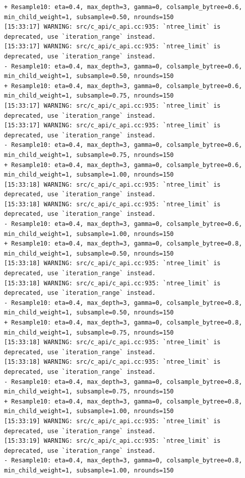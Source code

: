 \documentclass[
  letterpaper,
  DIV=11,
  numbers=noendperiod]{scrartcl}
\begin{document}
\begin{verbatim}
+ Resample10: eta=0.4, max_depth=3, gamma=0, colsample_bytree=0.6, min_child_weight=1, subsample=0.50, nrounds=150 
[15:33:17] WARNING: src/c_api/c_api.cc:935: `ntree_limit` is deprecated, use `iteration_range` instead.
[15:33:17] WARNING: src/c_api/c_api.cc:935: `ntree_limit` is deprecated, use `iteration_range` instead.
- Resample10: eta=0.4, max_depth=3, gamma=0, colsample_bytree=0.6, min_child_weight=1, subsample=0.50, nrounds=150 
+ Resample10: eta=0.4, max_depth=3, gamma=0, colsample_bytree=0.6, min_child_weight=1, subsample=0.75, nrounds=150 
[15:33:17] WARNING: src/c_api/c_api.cc:935: `ntree_limit` is deprecated, use `iteration_range` instead.
[15:33:17] WARNING: src/c_api/c_api.cc:935: `ntree_limit` is deprecated, use `iteration_range` instead.
- Resample10: eta=0.4, max_depth=3, gamma=0, colsample_bytree=0.6, min_child_weight=1, subsample=0.75, nrounds=150 
+ Resample10: eta=0.4, max_depth=3, gamma=0, colsample_bytree=0.6, min_child_weight=1, subsample=1.00, nrounds=150 
[15:33:18] WARNING: src/c_api/c_api.cc:935: `ntree_limit` is deprecated, use `iteration_range` instead.
[15:33:18] WARNING: src/c_api/c_api.cc:935: `ntree_limit` is deprecated, use `iteration_range` instead.
- Resample10: eta=0.4, max_depth=3, gamma=0, colsample_bytree=0.6, min_child_weight=1, subsample=1.00, nrounds=150 
+ Resample10: eta=0.4, max_depth=3, gamma=0, colsample_bytree=0.8, min_child_weight=1, subsample=0.50, nrounds=150 
[15:33:18] WARNING: src/c_api/c_api.cc:935: `ntree_limit` is deprecated, use `iteration_range` instead.
[15:33:18] WARNING: src/c_api/c_api.cc:935: `ntree_limit` is deprecated, use `iteration_range` instead.
- Resample10: eta=0.4, max_depth=3, gamma=0, colsample_bytree=0.8, min_child_weight=1, subsample=0.50, nrounds=150 
+ Resample10: eta=0.4, max_depth=3, gamma=0, colsample_bytree=0.8, min_child_weight=1, subsample=0.75, nrounds=150 
[15:33:18] WARNING: src/c_api/c_api.cc:935: `ntree_limit` is deprecated, use `iteration_range` instead.
[15:33:18] WARNING: src/c_api/c_api.cc:935: `ntree_limit` is deprecated, use `iteration_range` instead.
- Resample10: eta=0.4, max_depth=3, gamma=0, colsample_bytree=0.8, min_child_weight=1, subsample=0.75, nrounds=150 
+ Resample10: eta=0.4, max_depth=3, gamma=0, colsample_bytree=0.8, min_child_weight=1, subsample=1.00, nrounds=150 
[15:33:19] WARNING: src/c_api/c_api.cc:935: `ntree_limit` is deprecated, use `iteration_range` instead.
[15:33:19] WARNING: src/c_api/c_api.cc:935: `ntree_limit` is deprecated, use `iteration_range` instead.
- Resample10: eta=0.4, max_depth=3, gamma=0, colsample_bytree=0.8, min_child_weight=1, subsample=1.00, nrounds=150 

\end{verbatim}
\end{document}

